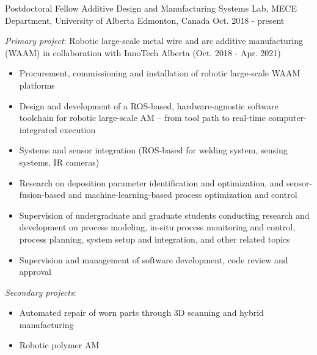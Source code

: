 \begin{cventries}
  \cventry
    {Postdoctoral Fellow} %
    {Additive Design and Manufacturing Systems Lab, MECE Department, University of Alberta} %
    {Edmonton, Canada} %
    {Oct. 2018 - present} %
    {
      \begin{cvitems}
        \item \emph{Primary project}: Robotic large-scale metal wire and arc additive manufacturing (WAAM) \newline
        in collaboration with InnoTech Alberta (Oct. 2018 - Apr. 2021)
        \begin{itemize}
          \item Procurement, commissioning and installation of robotic large-scale WAAM platforms
          \item Design and development of a ROS-based, hardware-agnostic software toolchain for robotic large-scale AM -- from tool path to real-time computer-integrated execution
          \item Systems and sensor integration (ROS-based for welding system, sensing systems, IR cameras)
          \item Research on deposition parameter identification and optimization, and sensor-fusion-based and machine-learning-based process optimization and control
          \item Supervision of undergraduate and graduate students conducting research and development on process modeling, 
                in-situ process monitoring and control, process planning, system setup and integration, and other related topics
          \item Supervision and management of software development, code review and approval
        \end{itemize}
        \item \emph{Secondary projects}:
        \begin{itemize}
          \item Automated repair of worn parts through 3D scanning and hybrid manufacturing
          \item Robotic polymer AM
        \end{itemize}
      \end{cvitems}
    }


\end{cventries}
